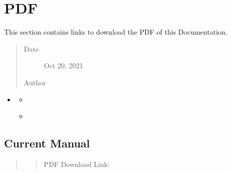 \documentclass[letterpaper,10pt,english]{sphinxmanual}
\begin{document}
\chapter{PDF}
\label{\detokenize{pdf:pdf}}\label{\detokenize{pdf:pdf-page}}\label{\detokenize{pdf::doc}}
\begin{sphinxShadowBox}

\sphinxAtStartPar
This section contains links to download the PDF of this Documentation.
\begin{quote}\begin{description}
\item[{Date}] \leavevmode
\sphinxAtStartPar
Oct 20, 2021

\item[{Author}] \leavevmode
\sphinxAtStartPar
{}

\end{description}\end{quote}
\end{sphinxShadowBox}

\begin{sphinxShadowBox}
\begin{itemize}
\item {} 
\sphinxAtStartPar
{}\label{\detokenize{pdf:id1}}{\hyperref[\detokenize{pdf:pdf}]{}}
\begin{itemize}
\item {} 
\sphinxAtStartPar
{}\label{\detokenize{pdf:id2}}{\hyperref[\detokenize{pdf:current-manual}]{}}

\item {} 
\sphinxAtStartPar
{}\label{\detokenize{pdf:id3}}{\hyperref[\detokenize{pdf:archived-data}]{}}

\end{itemize}

\end{itemize}
\end{sphinxShadowBox}


\section{Current Manual}
\label{\detokenize{pdf:current-manual}}\begin{quote}
\begin{quote}\begin{description}
\item[{PDF Download Link:}] \leavevmode
\sphinxAtStartPar
{}

\end{description}\end{quote}
\end{quote}
\end{document}

